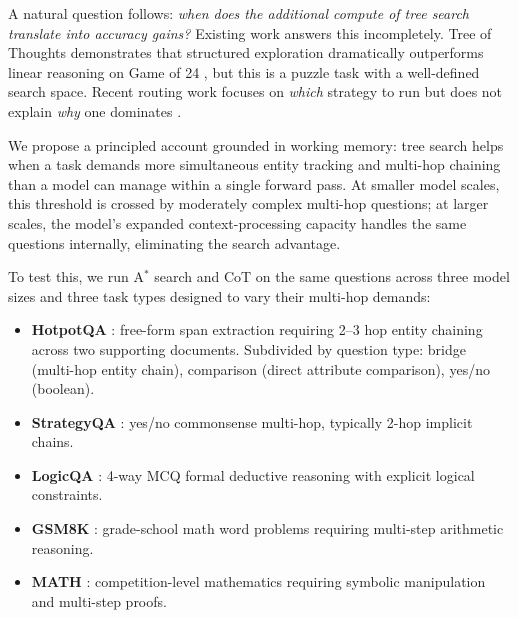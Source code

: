 \documentclass{article}
\newcommand{\astar}{A$^*$\xspace}
\begin{document}
A natural question follows: \emph{when does the additional compute of tree search translate into accuracy gains?} Existing work answers this incompletely. Tree of Thoughts demonstrates that structured exploration dramatically outperforms linear reasoning on Game of 24 \citep{yao2023treethoughtsdeliberateproblem}, but this is a puzzle task with a well-defined search space. Recent routing work focuses on \emph{which} strategy to run but does not explain \emph{why} one dominates \citep{sui2025stopoverthinkingsurveyefficient}.

We propose a principled account grounded in working memory: tree search helps when a task demands more simultaneous entity tracking and multi-hop chaining than a model can manage within a single forward pass. At smaller model scales, this threshold is crossed by moderately complex multi-hop questions; at larger scales, the model's expanded context-processing capacity handles the same questions internally, eliminating the search advantage.

To test this, we run \astar search and CoT on the same questions across three model sizes and three task types designed to vary their multi-hop demands:
\begin{itemize}[leftmargin=*, noitemsep]
  \item \textbf{HotpotQA} \citep{yang2018hotpotqa}: free-form span extraction requiring 2--3 hop entity chaining across two supporting documents. Subdivided by question type: bridge (multi-hop entity chain), comparison (direct attribute comparison), yes/no (boolean).
  \item \textbf{StrategyQA} \citep{geva2021did}: yes/no commonsense multi-hop, typically 2-hop implicit chains.
  \item \textbf{LogicQA} \citep{liu2020logiqa}: 4-way MCQ formal deductive reasoning with explicit logical constraints.
  \item \textbf{GSM8K} \citep{cobbe2021trainingverifierssolvemath}: grade-school math word problems requiring multi-step arithmetic reasoning.
  \item \textbf{MATH} \citep{hendrycks2021measuringmathematicalproblemsolving}: competition-level mathematics requiring symbolic manipulation and multi-step proofs.
\end{itemize}
\end{document}
